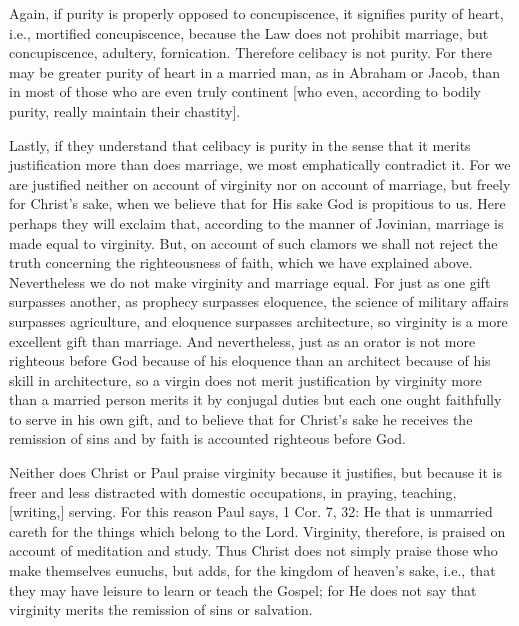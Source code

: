 Again, if purity is properly opposed to concupiscence, it signifies
purity of heart, i.e., mortified concupiscence, because the Law does
not prohibit marriage, but concupiscence, adultery, fornication.
Therefore celibacy is not purity.  For there may be greater purity of
heart in a married man, as in Abraham or Jacob, than in most of those
who are even truly continent [who even, according to bodily purity,
really maintain their chastity].

Lastly, if they understand that celibacy is purity in the sense that
it merits justification more than does marriage, we most emphatically
contradict it.  For we are justified neither on account of virginity
nor on account of marriage, but freely for Christ's sake, when we
believe that for His sake God is propitious to us.  Here perhaps they
will exclaim that, according to the manner of Jovinian, marriage is
made equal to virginity.  But, on account of such clamors we shall
not reject the truth concerning the righteousness of faith, which we
have explained above.  Nevertheless we do not make virginity and
marriage equal.  For just as one gift surpasses another, as prophecy
surpasses eloquence, the science of military affairs surpasses
agriculture, and eloquence surpasses architecture, so virginity is a
more excellent gift than marriage.  And nevertheless, just as an
orator is not more righteous before God because of his eloquence than
an architect because of his skill in architecture, so a virgin does
not merit justification by virginity more than a married person
merits it by conjugal duties but each one ought faithfully to serve
in his own gift, and to believe that for Christ's sake he receives
the remission of sins and by faith is accounted righteous before God.

Neither does Christ or Paul praise virginity because it justifies,
but because it is freer and less distracted with domestic occupations,
in praying, teaching, [writing,] serving.  For this reason Paul says,
1 Cor. 7, 32: He that is unmarried careth for the things which
belong to the Lord.  Virginity, therefore, is praised on account of
meditation and study.  Thus Christ does not simply praise those who
make themselves eunuchs, but adds, for the kingdom of heaven's sake,
i.e., that they may have leisure to learn or teach the Gospel; for He
does not say that virginity merits the remission of sins or salvation.

